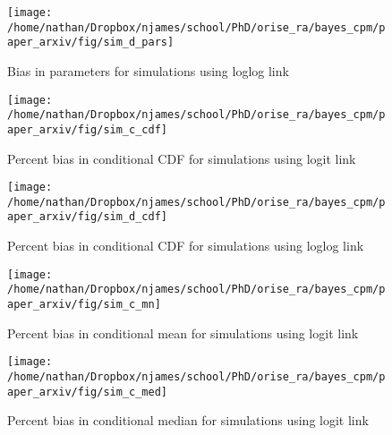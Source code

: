 \documentclass[
]{article}
\newcommand{\beginsupplement}{
  \setcounter{table}{0}
  \renewcommand{\thetable}{S\arabic{table}}
  \setcounter{figure}{0}
  \renewcommand{\thefigure}{S\arabic{figure}}
}
\begin{document}
\beginsupplement

\begin{figure}

{\centering \texttt{[image: /home/nathan/Dropbox/njames/school/PhD/orise\_ra/bayes\_cpm/paper\_arxiv/fig/sim\_d\_pars]} 

}

\caption{Bias in parameters for simulations using loglog link}\label{fig:simplt-pars-3}
\end{figure}

\begin{figure}

{\centering \texttt{[image: /home/nathan/Dropbox/njames/school/PhD/orise\_ra/bayes\_cpm/paper\_arxiv/fig/sim\_c\_cdf]} 

}

\caption{Percent bias in conditional CDF for simulations using logit link}\label{fig:simplt-cdf-2}
\end{figure}

\begin{figure}

{\centering \texttt{[image: /home/nathan/Dropbox/njames/school/PhD/orise\_ra/bayes\_cpm/paper\_arxiv/fig/sim\_d\_cdf]} 

}

\caption{Percent bias in conditional CDF for simulations using loglog link}\label{fig:simplt-cdf-3}
\end{figure}

\begin{figure}

{\centering \texttt{[image: /home/nathan/Dropbox/njames/school/PhD/orise\_ra/bayes\_cpm/paper\_arxiv/fig/sim\_c\_mn]} 

}

\caption{Percent bias in conditional mean for simulations using logit link}\label{fig:simplt-mn-2}
\end{figure}

\begin{figure}

{\centering \texttt{[image: /home/nathan/Dropbox/njames/school/PhD/orise\_ra/bayes\_cpm/paper\_arxiv/fig/sim\_c\_med]} 

}

\caption{Percent bias in conditional median for simulations using logit link}\label{fig:simplt-med-2}
\end{figure}
\end{document}
